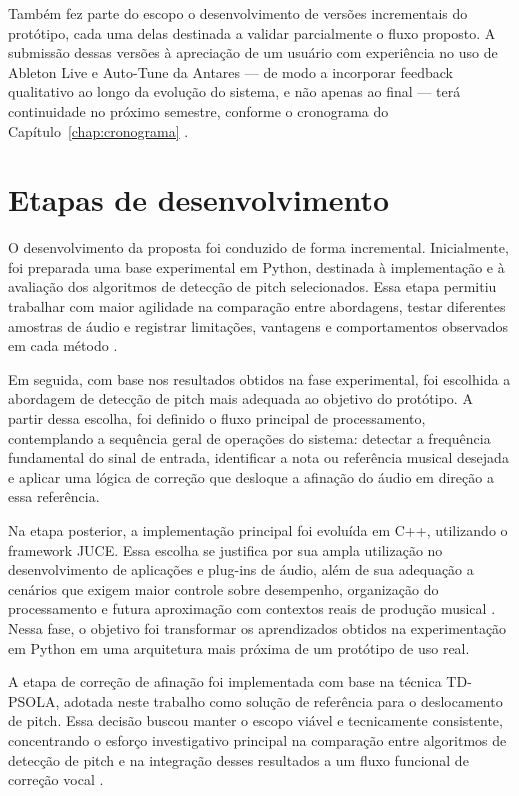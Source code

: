 Também fez parte do escopo o desenvolvimento de versões incrementais do protótipo, cada uma delas destinada a validar parcialmente o fluxo proposto. A submissão dessas versões à apreciação de um usuário com experiência no uso de Ableton Live e Auto-Tune da Antares --- de modo a incorporar feedback qualitativo ao longo da evolução do sistema, e não apenas ao final --- terá continuidade no próximo semestre, conforme o cronograma do Capítulo~\ref{chap:cronograma} \cite{antares_autotune_pro,ableton_live}.

\section{Etapas de desenvolvimento}

O desenvolvimento da proposta foi conduzido de forma incremental. Inicialmente, foi preparada uma base experimental em Python, destinada à implementação e à avaliação dos algoritmos de detecção de pitch selecionados. Essa etapa permitiu trabalhar com maior agilidade na comparação entre abordagens, testar diferentes amostras de áudio e registrar limitações, vantagens e comportamentos observados em cada método \cite{delacuadra2007pitch}.

Em seguida, com base nos resultados obtidos na fase experimental, foi escolhida a abordagem de detecção de pitch mais adequada ao objetivo do protótipo. A partir dessa escolha, foi definido o fluxo principal de processamento, contemplando a sequência geral de operações do sistema: detectar a frequência fundamental do sinal de entrada, identificar a nota ou referência musical desejada e aplicar uma lógica de correção que desloque a afinação do áudio em direção a essa referência.

Na etapa posterior, a implementação principal foi evoluída em C++, utilizando o framework JUCE. Essa escolha se justifica por sua ampla utilização no desenvolvimento de aplicações e plug-ins de áudio, além de sua adequação a cenários que exigem maior controle sobre desempenho, organização do processamento e futura aproximação com contextos reais de produção musical \cite{juce_website,juce_github, cppreference_cpp}. Nessa fase, o objetivo foi transformar os aprendizados obtidos na experimentação em Python em uma arquitetura mais próxima de um protótipo de uso real.

A etapa de correção de afinação foi implementada com base na técnica TD-PSOLA, adotada neste trabalho como solução de referência para o deslocamento de pitch. Essa decisão buscou manter o escopo viável e tecnicamente consistente, concentrando o esforço investigativo principal na comparação entre algoritmos de detecção de pitch e na integração desses resultados a um fluxo funcional de correção vocal \cite{moulines1990psola,aalto_psola}.

